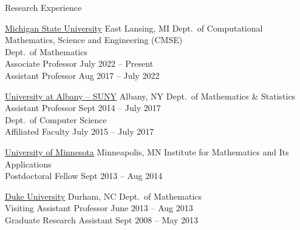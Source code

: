\documentclass{resume} %
\begin{document}
\begin{rSection}{Research Experience}

\college
{\href{http://msu.edu/}{Michigan State University}}
{East Lansing, MI}
Dept.~of Computational Mathematics, Science and Engineering (CMSE)\\
 Dept.~of Mathematics\\
\Degree
{Associate Professor}
{July 2022 -- Present}\\
\Degree
{Assistant Professor}
{Aug 2017 -- July 2022}

\college
{\href{http://www.albany.edu/}{University at Albany -- SUNY}}
{Albany, NY}
 Dept.~of Mathematics \& Statistics\\
\Degree
{Assistant Professor}
{Sept 2014 -- July 2017}\\
 Dept.~of Computer Science\\
\Degree
{Affiliated Faculty}
{July 2015 -- July 2017}

\college
{\href{http://www.umn.edu/}{University of Minnesota}}
{Minneapolis, MN}
Institute for Mathematics and Its Applications\\
\Degree
{Postdoctoral Fellow}
{Sept 2013 -- Aug 2014}

\college
{\href{http://www.duke.edu/}{Duke University}}
{Durham, NC}
Dept.~of Mathematics\\
\Degree
{Visiting Assistant Professor}
{June 2013 -- Aug 2013}\\
\Degree
{Graduate Research Assistant}
{Sept 2008 -- May 2013}



\end{rSection}
\end{document}
